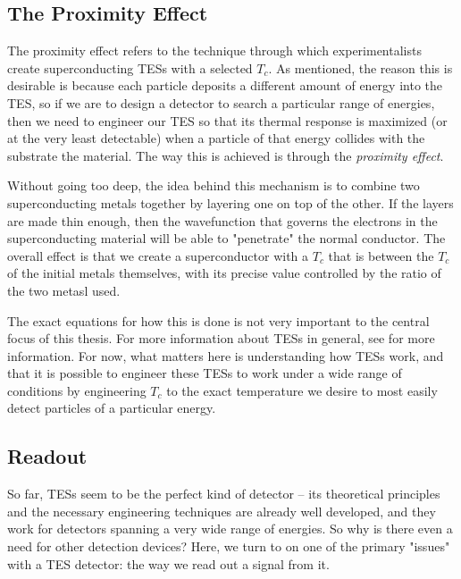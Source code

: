 \subsection{The Proximity Effect}
The proximity effect refers to the technique through which experimentalists create superconducting TESs with
a selected \( T_c \). As mentioned, the reason this is desirable is because each particle deposits a
different amount of energy into the TES, so if we are to design a detector to search a particular range of
energies, then we need to engineer our TES so that its thermal response is maximized (or at the very least
detectable) when a particle of that energy collides with the substrate the material. The way this is achieved
is through the \textit{proximity effect}. 

Without going too deep, the idea behind this mechanism is to combine two superconducting metals together
by layering one on top of the other. If the layers are made thin enough, then
the wavefunction that governs the electrons in the superconducting material will be able to "penetrate" the
normal conductor. The overall effect is that we create a superconductor with a \( T_c \) that is between the
\( T_c \) of the initial metals themselves, with its precise value controlled by the ratio of the two metasl
used. 

The exact equations for how this is done is not very important to the central focus of this
thesis. For more information about TESs in general, see \cite{luciaTransitionEdgeSensors2024} for more
information. For now, what matters here is understanding how TESs work, and that it is possible to engineer
these TESs to work under a wide range of conditions by engineering \( T_c \) to the exact temperature we
desire to most easily detect particles of a particular energy. 

\subsection{Readout}

So far, TESs seem to be the perfect kind of detector -- its theoretical principles and the necessary 
engineering techniques are already well developed, and they work for detectors spanning a very wide range of
energies. So why is there even a need for other detection devices? Here, we turn to on
one of the primary "issues" with a TES detector: the way we read out a signal from it. 


